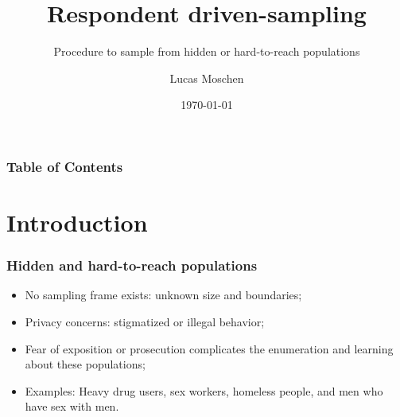 \documentclass{beamer}
\title[Respondent driven-sampling]
{Respondent driven-sampling}
\subtitle{Procedure to sample from hidden or hard-to-reach populations}
\author[Lucas Moschen]
{Lucas Moschen}
\institute[EMAp/FGV]
{
  School of Applied Mathematics\\
  Fundação Getulio Vargas
}
\date[\today]
{\today}
\newcommand{\Space}{\vspace{3ex}}
\begin{document}
\frame{\titlepage}

\begin{frame}
\frametitle{Table of Contents}
\tableofcontents
\end{frame}

\section{Introduction}

\begin{frame}
\frametitle{Hidden and hard-to-reach populations}

\begin{itemize}
    \justifying
    \item No sampling frame exists: unknown size and boundaries;
    \Space
    \item Privacy concerns: stigmatized or illegal behavior; 
    \Space
    \item Fear of exposition or prosecution complicates the enumeration and learning about these populations;
    \Space
    \item Examples: Heavy drug users, sex workers, homeless people, and men who have sex
    with men. 
\end{itemize}

\end{frame}
\end{document}
